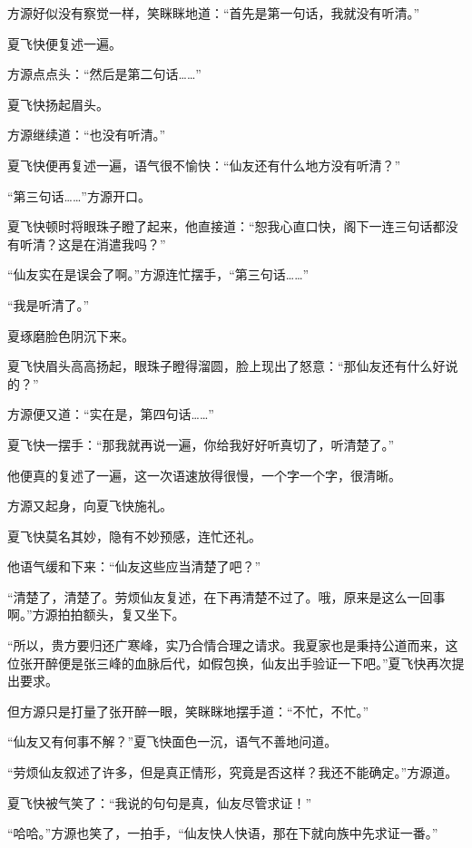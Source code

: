 
\begin{this_body}

方源好似没有察觉一样，笑眯眯地道：“首先是第一句话，我就没有听清。”

夏飞快便复述一遍。

方源点点头：“然后是第二句话……”

夏飞快扬起眉头。

方源继续道：“也没有听清。”

夏飞快便再复述一遍，语气很不愉快：“仙友还有什么地方没有听清？”

“第三句话……”方源开口。

夏飞快顿时将眼珠子瞪了起来，他直接道：“恕我心直口快，阁下一连三句话都没有听清？这是在消遣我吗？”

“仙友实在是误会了啊。”方源连忙摆手，“第三句话……”

“我是听清了。”

夏琢磨脸色阴沉下来。

夏飞快眉头高高扬起，眼珠子瞪得溜圆，脸上现出了怒意：“那仙友还有什么好说的？”

方源便又道：“实在是，第四句话……”

夏飞快一摆手：“那我就再说一遍，你给我好好听真切了，听清楚了。”

他便真的复述了一遍，这一次语速放得很慢，一个字一个字，很清晰。

方源又起身，向夏飞快施礼。

夏飞快莫名其妙，隐有不妙预感，连忙还礼。

他语气缓和下来：“仙友这些应当清楚了吧？”

“清楚了，清楚了。劳烦仙友复述，在下再清楚不过了。哦，原来是这么一回事啊。”方源拍拍额头，复又坐下。

“所以，贵方要归还广寒峰，实乃合情合理之请求。我夏家也是秉持公道而来，这位张开醉便是张三峰的血脉后代，如假包换，仙友出手验证一下吧。”夏飞快再次提出要求。

但方源只是打量了张开醉一眼，笑眯眯地摆手道：“不忙，不忙。”

“仙友又有何事不解？”夏飞快面色一沉，语气不善地问道。

“劳烦仙友叙述了许多，但是真正情形，究竟是否这样？我还不能确定。”方源道。

夏飞快被气笑了：“我说的句句是真，仙友尽管求证！”

“哈哈。”方源也笑了，一拍手，“仙友快人快语，那在下就向族中先求证一番。”


\end{this_body}
